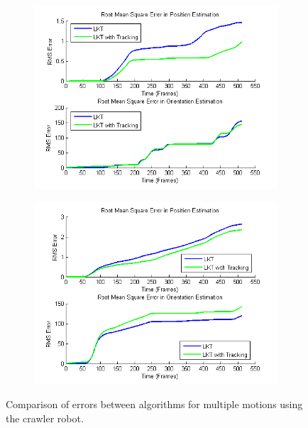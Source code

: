 \documentclass[letterpaper, 10 pt, conference]{ieeeconf}
\begin{document}
\begin{figure}[tb]
	\centering
	\begin{subfigure}{\columnwidth}
		  \centering
		  \includegraphics[width=\columnwidth]{crawler1_rms.png}
		  \label{crawler:pattern1_error}
	\end{subfigure}
	\begin{subfigure}{\columnwidth}
		  \centering
		  \includegraphics[width=\columnwidth]{crawler2_rms.png}
		  \label{crawler:pattern2_error}
	\end{subfigure}
	\caption{Comparison of errors between algorithms for multiple motions using the crawler robot.}
    \label{crawler_error}
\end{figure}
\end{document}

